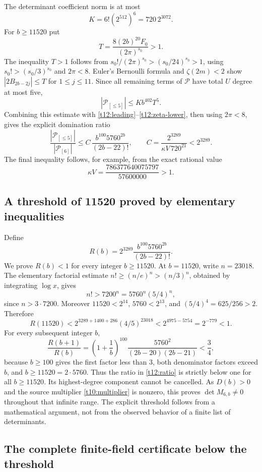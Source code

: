 \documentclass[11pt,letterpaper]{article}
\numberwithin{equation}{section}
\theoremstyle{definition}
\theoremstyle{remark}
\begin{document}
The determinant coefficient norm is at most
\[
 K=6!(2^{512})^6=720\,2^{3072}.
\]
For $b\ge11520$ put
\[
 T=\frac{8(2b)^{20}F_0}{(2\pi)^{s_0}}>1.
\]
The inequality $T>1$ follows from $s_0!/(2\pi)^{s_0}>(s_0/24)^{s_0}>1$,
using $s_0!>(s_0/3)^{s_0}$ and $2\pi<8$.
Euler's Bernoulli formula and $\zeta(2m)<2$ show
$|2B_{2b-2j}|\le T$ for $1\le j\le11$.
Since all remaining terms of $\mathscr P$ have total $U$ degree
at most five,
\[
 |\mathscr P_{[\le5]}|\le Kb^{402}T^5.
\]
Combining this estimate with \eqref{t12:leading}--\eqref{t12:zeta-lower},
then using $2\pi<8$, gives the explicit domination ratio
\begin{equation}\label{t12:ratio}
 \frac{|\mathscr P_{[\le5]}|}{|\mathscr P_{[6]}|}
 \le C\,\frac{b^{100}5760^{2b}}{(2b-22)!},\qquad
 C=\frac{2^{3289}}{\kappa V\,720^{21}}<2^{3289}.
\end{equation}
The final inequality follows, for example, from the exact rational value
\[
 \kappa V=\frac{786377640075797}{57600000}>1.
\]

\subsection{A threshold of 11520 proved by elementary inequalities}

Define
\[
 R(b)=2^{3289}\frac{b^{100}5760^{2b}}{(2b-22)!}.
\]
We prove $R(b)<1$ for every integer $b\ge11520$. At $b=11520$,
write $n=23018$. The elementary factorial estimate
$n!\ge(n/e)^n>(n/3)^n$, obtained by integrating $\log x$, gives
\[
 n!>7200^n=5760^n(5/4)^n,
\]
since $n>3\cdot7200$. Moreover $11520<2^{14}$,
$5760<2^{13}$, and $(5/4)^4=625/256>2$. Therefore
\begin{equation}\label{t12:initial-bound}
 R(11520)
 <2^{3289+1400+286}(4/5)^{23018}
 <2^{4975-5754}=2^{-779}<1.
\end{equation}
For every subsequent integer $b$,
\[
 \frac{R(b+1)}{R(b)}
 =\left(1+\frac1b\right)^{100}
       \frac{5760^2}{(2b-20)(2b-21)}<\frac34,
\]
because $b\ge100$ gives the first factor less than $3$,
both denominator factors exceed $b$, and $b\ge11520=2\cdot5760$.
Thus the ratio in \eqref{t12:ratio} is strictly below one for all
$b\ge11520$. Its highest-degree component cannot be cancelled.
As $D(b)>0$ and the source multiplier \eqref{t10:multiplier} is
nonzero, this proves $\det M_{6,b}\ne0$ throughout that infinite
range. The explicit threshold follows from a mathematical argument,
not from the observed behavior of a finite list of determinants.

\subsection{The complete finite-field certificate below the threshold}
\end{document}
